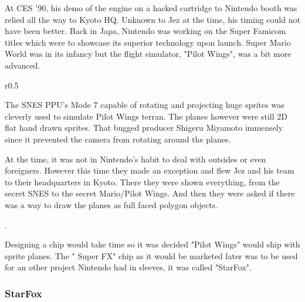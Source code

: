 At CES '90, his demo of the engine on a hacked cartridge to Nintendo booth was relied all the way to Kyoto HQ. Unknown to Jez at the time, his timing could not have been better. Back in Japa, Nintendo was working on the Super Famicom titles which were to showcase its superior technology upon launch. Super Mario World was in its infancy but the flight simulator, "Pilot Wings", was a bit more advanced.\\ 
\par
\begin{wrapfigure}[14]{r}{0.5\textwidth}{
\centering {}}
\end{wrapfigure}
The SNES PPU's Mode 7 capable of rotating and projecting huge sprites was cleverly used to simulate Pilot Wings terran. The planes however were still 2D flat hand drawn sprites. That bugged producer Shigeru Miyamoto immensely since it prevented the camera from rotating around the planes.\\
\par
At the time, it was not in Nintendo's habit to deal with outsides or even foreigners. However this time they made an exception and flew Jez and his team to their headquarters in Kyoto. There they were shown everything, from the secret SNES to the secret Mario/Pilot Wings. And then they were asked if there was a way to draw the planes as full faced polygon objects.\\
\par
{}.\\
\par

Designing a chip would take time so it was decided "Pilot Wings" would ship with sprite planes. The "
Super FX" chip as it would be marketed later was to be used for an other project Nintendo had in sleeves, it was called "StarFox".\\

\subsubsection{StarFox}

